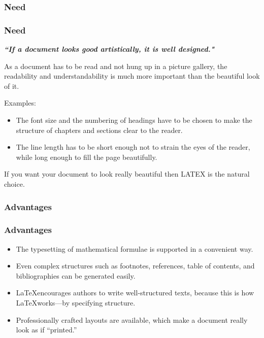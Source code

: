 \documentclass{beamer}
\begin{document}
            \subsubsection{Need}
            \begin{frame}[shrink]
            \frametitle{Need}
            \transboxout
                \begin{block}{
                    \textbf{\textsl{``If a document looks good artistically, it is well designed."}}
                    }
                \end{block}
                As a document has to be read and not hung up in a picture gallery, the readability and understandability is much more important than the beautiful look of it.

                Examples:
                \begin{itemize}
                    \item The font size and the numbering of headings have to be chosen to make the structure of chapters and sections clear to the reader. 
                    \item The line length has to be short enough not to strain the eyes of the reader, while long enough to fill the page beautifully.
                \end{itemize}
                If you want your document to look really beautiful then LATEX is the natural choice.
            \end{frame}

            \subsubsection{Advantages}
            \begin{frame}
            \frametitle{Advantages}
            \transwipe
                \begin{itemize}
                    \item The typesetting of mathematical formulae is supported in a convenient way.
                    \item Even complex structures such as footnotes, references, table of contents, and bibliographies can be generated easily.
                    \item \LaTeX encourages authors to write well-structured texts, because this is how \LaTeX works—by specifying structure.
                    \item Professionally crafted layouts are available, which make a document really look as if “printed.”
                \end{itemize}
            \end{frame}
\end{document}
